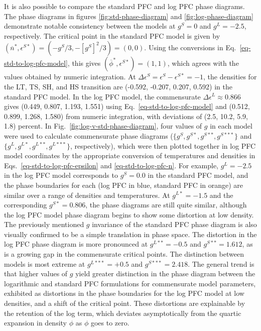 It is also possible to compare the standard PFC and log PFC phase diagrams.  The phase diagrams in figures \ref{fig:std-phase-diagram} and \ref{fig:log-phase-diagram} demonstrate notable consistency between the models at $g^S=0$ and $g^L=-2.5$, respectively.  The critical point in the standard PFC model is given by $(\overline{n}^*, \epsilon^{S*}) = (-g^S/3, -[g^S]^2/3) = (0,0)$.  Using the conversions in Eq.~\ref{eq-std-to-log-pfc-model}, this gives $(\overline{\phi}^*, \epsilon^{S*}) = (1, 1)$, which agrees with the values obtained by numeric integration.  At $\Delta \epsilon^S = \epsilon^S - \epsilon^{S*} = -1$, the densities for the LT, TS, SH, and HS transition are (-0.592, -0.207, 0.207, 0.592) in the standard PFC model.  In the log PFC model, the commensurate $\Delta \epsilon^L \approx 0.866$ gives (0.449, 0.807, 1.193, 1.551) using Eq.~\ref{eq-std-to-log-pfc-model} and (0.512, 0.899, 1.268, 1.580) from numeric integration, with deviations of (2.5, 10.2, 5.9, 1.8) percent.  In Fig.~\ref{fig:log-v-std-phase-diagram}, four values of $g$ in each model were used to calculate commensurate phase diagrams ($\{g^{S}, g^{S*}, g^{S**}, g^{S***}\}$ and $\{g^{L}, g^{L*}, g^{L**}, g^{L***}\}$, respectively), which were then plotted together in log PFC model coordinates by the appropriate conversion of temperatures and densities in Eqs.~\ref{eq-std-to-log-pfc-epsilon} and \ref{eq-std-to-log-pfc-n}.  For example, $g^L = -2.5$ in the log PFC model corresponds to $g^S=0.0$ in the standard PFC model, and the phase boundaries for each (log PFC in blue, standard PFC in orange) are similar over a range of densities and temperatures.  At $g^{L*} = -1.5$ and the corresponding $g^{S*}=0.806$, the phase diagrams are still quite similar, although the log PFC model phase diagram begins to show some distortion at low density.  The previously mentioned $g$ invariance of the standard PFC phase diagram is also visually confirmed to be a simple translation in phase space.  The distortion in the log PFC phase diagram is more pronounced at $g^{L**} = -0.5$ and $g^{S**} = 1.612$, as is a growing gap in the commensurate critical points.  The distinction between models is most extreme at $g^{L***} = +0.5$ and $g^{S***} = 2.418$.  The general trend is that higher values of $g$ yield greater distinction in the phase diagram between the logarithmic and standard PFC formulations for commensurate model parameters, exhibited as distortions in the phase boundaries for the log PFC model at low densities, and a shift of the critical point.  These distortions are explainable by the retention of the log term, which deviates asymptotically from the quartic expansion in density $\phi$ as $\phi$ goes to zero.
